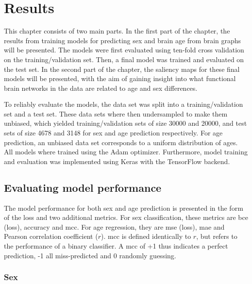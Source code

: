 \chapter{Results}
This chapter consists of two main parts. In the first part of the chapter, the results from training models for predicting sex and brain age from brain graphs will be presented. The models were first evaluated using ten-fold cross validation on the training/validation set. Then, a final model was trained and evaluated on the test set. In the second part of the chapter, the saliency maps for these final models will be presented, with the aim of gaining insight into what functional brain networks in the data are related to age and sex differences. 

To reliably evaluate the models, the data set was split into a training/validation set and a test set. These data sets where then undersampled to make them unbiased, which yielded training/validation sets of size 30000 and 20000, and test sets of size 4678 and 3148 for sex and age prediction respectively. For age prediction, an unbiased data set corresponds to a uniform distribution of ages. All models where trained using the Adam optimizer. Furthermore, model training and evaluation was implemented using Keras with the TensorFlow backend. 

\section{Evaluating model performance}
\label{sec:model_pred}
The model performance for both sex and age prediction is presented in the form of the loss and two additional metrics. For sex classification, these metrics are \acrfull{bce} (loss), accuracy and \acrfull{mcc}. For age regression, they are \acrfull{mse} (loss), \acrfull{mae} and Pearson correlation coefficient ($r$). \acrshort{mcc} is defined identically to $r$, but refers to the performance of a binary classifier. A \acrshort{mcc} of +1 thus indicates a perfect prediction, -1 all miss-predicted and 0 randomly guessing.

\subsection{Sex}

